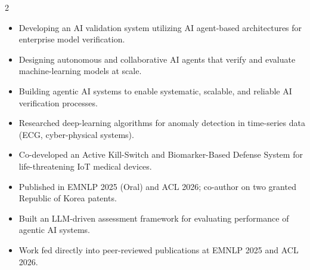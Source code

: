 \documentclass[10pt,letterpaper,withhyper]{altacv}
\begin{document}


\makecvheader

\begin{paracol}{2}


\begin{itemize}
\item Developing an AI validation system utilizing AI agent-based architectures for enterprise model verification.
\item Designing autonomous and collaborative AI agents that verify and evaluate machine-learning models at scale.
\item Building agentic AI systems to enable systematic, scalable, and reliable AI verification processes.
\end{itemize}

\divider

\begin{itemize}
\item Researched deep-learning algorithms for anomaly detection in time-series data (ECG, cyber-physical systems).
\item Co-developed an Active Kill-Switch and Biomarker-Based Defense System for life-threatening IoT medical devices.
\item Published in EMNLP 2025 (Oral) and ACL 2026; co-author on two granted Republic of Korea patents.
\end{itemize}

\divider

\begin{itemize}
\item Built an LLM-driven assessment framework for evaluating performance of agentic AI systems.
\item Work fed directly into peer-reviewed publications at EMNLP 2025 and ACL 2026.
\end{itemize}


\end{paracol}
\end{document}
